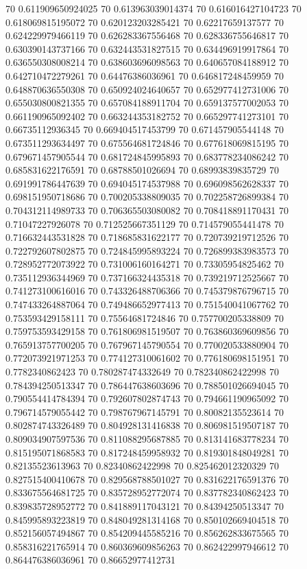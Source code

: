 {70 0.611909650924025
70 0.613963039014374
70 0.616016427104723
70 0.618069815195072
70 0.620123203285421
70 0.62217659137577
70 0.624229979466119
70 0.626283367556468
70 0.628336755646817
70 0.630390143737166
70 0.632443531827515
70 0.634496919917864
70 0.636550308008214
70 0.638603696098563
70 0.640657084188912
70 0.642710472279261
70 0.64476386036961
70 0.646817248459959
70 0.648870636550308
70 0.650924024640657
70 0.652977412731006
70 0.655030800821355
70 0.657084188911704
70 0.659137577002053
70 0.661190965092402
70 0.663244353182752
70 0.665297741273101
70 0.66735112936345
70 0.669404517453799
70 0.671457905544148
70 0.673511293634497
70 0.675564681724846
70 0.677618069815195
70 0.679671457905544
70 0.681724845995893
70 0.683778234086242
70 0.685831622176591
70 0.68788501026694
70 0.68993839835729
70 0.691991786447639
70 0.694045174537988
70 0.696098562628337
70 0.698151950718686
70 0.700205338809035
70 0.702258726899384
70 0.704312114989733
70 0.706365503080082
70 0.708418891170431
70 0.71047227926078
70 0.712525667351129
70 0.714579055441478
70 0.716632443531828
70 0.718685831622177
70 0.720739219712526
70 0.722792607802875
70 0.724845995893224
70 0.726899383983573
70 0.728952772073922
70 0.731006160164271
70 0.73305954825462
70 0.735112936344969
70 0.737166324435318
70 0.739219712525667
70 0.741273100616016
70 0.743326488706366
70 0.745379876796715
70 0.747433264887064
70 0.749486652977413
70 0.751540041067762
70 0.753593429158111
70 0.75564681724846
70 0.757700205338809
70 0.759753593429158
70 0.761806981519507
70 0.763860369609856
70 0.765913757700205
70 0.767967145790554
70 0.770020533880904
70 0.772073921971253
70 0.774127310061602
70 0.776180698151951
70 0.7782340862423
70 0.780287474332649
70 0.782340862422998
70 0.784394250513347
70 0.786447638603696
70 0.788501026694045
70 0.790554414784394
70 0.792607802874743
70 0.794661190965092
70 0.796714579055442
70 0.798767967145791
70 0.80082135523614
70 0.802874743326489
70 0.804928131416838
70 0.806981519507187
70 0.809034907597536
70 0.811088295687885
70 0.813141683778234
70 0.815195071868583
70 0.817248459958932
70 0.819301848049281
70 0.82135523613963
70 0.82340862422998
70 0.825462012320329
70 0.827515400410678
70 0.829568788501027
70 0.831622176591376
70 0.833675564681725
70 0.835728952772074
70 0.837782340862423
70 0.839835728952772
70 0.841889117043121
70 0.84394250513347
70 0.845995893223819
70 0.848049281314168
70 0.850102669404518
70 0.852156057494867
70 0.854209445585216
70 0.856262833675565
70 0.858316221765914
70 0.860369609856263
70 0.862422997946612
70 0.864476386036961
70 0.86652977412731
}
